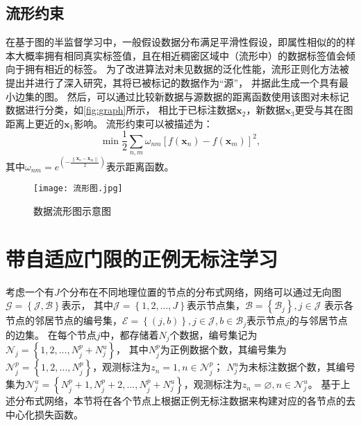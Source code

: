\subsection{流形约束}\label{Sec:ManifoldRegularization}
{在基于图的半监督学习中，一般假设数据分布满足平滑性假设，即属性相似的的样本大概率拥有相同真实标签值\cite{Belkin_Manifold_2006}，且在相近稠密区域中（流形中）的数据标签值会倾向于拥有相近的标签\cite{Huang_Semi_2014,Forestier_Semi_2016}。}
为了改进算法对未见数据的泛化性能，流形正则化方法被提出并进行了深入研究，其将已被标记的数据作为“源”，
并据此生成一个具有最小边集的图\cite{Zhu_Semi_2003,Zhu_IntroductionSemi_2009}。
然后，可以通过比较新数据与源数据的距离函数使用该图对未标记数据进行分类，如\autoref{fig:graph}所示，
相比于已标注数据$\boldsymbol x_2$，新数据$\boldsymbol x_3$更受与其在图距离上更近的$\boldsymbol x_1$影响。
流形约束可以被描述为：
\begin{equation}
    \label{manifold_regularization}
    \min\frac{1}{2}{\sum\limits_{n,m}
    {\omega_{nm}\left[f\left(\boldsymbol{x}_n\right)-f\left(\boldsymbol{x}_m\right)\right]} ^2},
\end{equation}
其中${\omega_{nm}}=e^{\left(-\frac{\left\|\boldsymbol x_n-\boldsymbol x_m\right\|}{2}\right)}$表示距离函数。
\begin{figure}[htbp]
    \centering
    \texttt{[image: 流形图.jpg]}
    \caption{\label{fig:graph}{数据流形图示意图}}
\end{figure}

\section{带自适应门限的正例无标注学习}\label{LossDesign}
{考虑一个有$J$个分布在不同地理位置的节点的分布式网络，网络可以通过无向图$\mathcal{G}=\left\{\mathcal{J},\mathcal{B}\right\}$表示，
其中$\mathcal{J}=\left\{1,2,...,J\right\}$表示节点集，$\mathcal{B}=\left\{\mathcal{B}_j\right\},j\in\mathcal{J}$
表示各节点的邻居节点的编号集，$\mathcal{E}=\left\{\left(j,b\right)\right\},j\in\mathcal{J},b\in\mathcal{B}_j$表示节点$j$的与邻居节点的边集。
在每个节点$j$中，都存储着$N_j$个数据，编号集记为$\mathcal{N}_j=\left\{1,2,...,N_j^p+N_j^u\right\}$，
其中$N_j^p$为正例数据个数，其编号集为$\mathcal{N}_j^p=\left\{1,2,...,N_j^p\right\}$，观测标注为$z_n=1,n\in\mathcal{N}_j^p$；
$N_j^u$为未标注数据个数，其编号集为$\mathcal{N}_j^u=\left\{N_j^p+1,N_j^p+2,...,N_j^p+N_j^u\right\}$，观测标注为$z_n=\varnothing,n\in\mathcal{N}_j^u$。
基于上述分布式网络，本节将在各个节点上根据正例无标注数据来构建对应的各节点的去中心化损失函数。}

